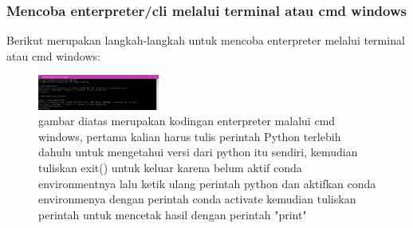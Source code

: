 \subsubsection{Mencoba enterpreter/cli melalui terminal atau cmd windows}
Berikut merupakan langkah-langkah untuk mencoba enterpreter melalui terminal atau cmd windows:
\begin{figure}[H]
		\includegraphics[width=4cm]{figures/1184065/EnterpreterNew.PNG}
		\centering
		\caption{gambar diatas merupakan kodingan enterpreter malalui cmd windows, pertama kalian harus tulis perintah Python terlebih dahulu untuk mengetahui versi dari python itu sendiri, kemudian tuliskan exit() untuk keluar karena belum aktif conda environmentnya lalu ketik ulang perintah python dan aktifkan conda environmenya dengan perintah conda activate kemudian tuliskan perintah untuk mencetak hasil dengan perintah "print" }
	\end{figure}
